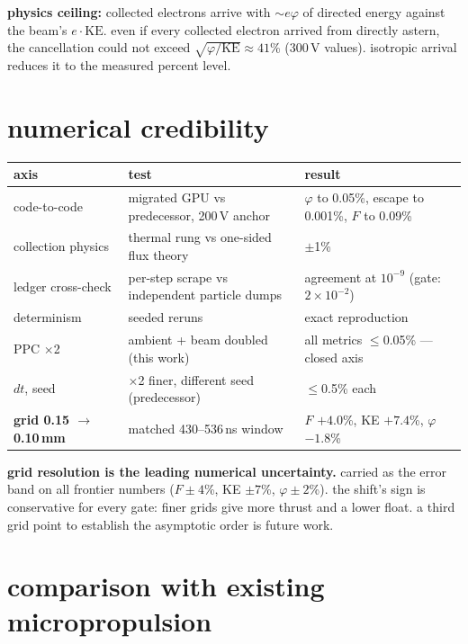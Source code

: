\documentclass[11pt]{article}
\begin{document}
\textbf{physics ceiling:} collected electrons arrive with $\sim$$e\varphi$ of
directed energy against the beam's $e\cdot\mathrm{KE}$.  even if every
collected electron arrived from directly astern, the cancellation could not
exceed $\sqrt{\varphi/\mathrm{KE}} \approx 41$\% (300\,V values).  isotropic
arrival reduces it to the measured percent level.

\section{numerical credibility}

\begin{center}\small
\begin{tabular}{lll}
\toprule
axis & test & result \\
\midrule
code-to-code & migrated GPU vs predecessor, 200\,V anchor &
  $\varphi$ to 0.05\%, escape to 0.001\%, $F$ to 0.09\% \\
collection physics & thermal rung vs one-sided flux theory & $\pm$1\% \\
ledger cross-check & per-step scrape vs independent particle dumps &
  agreement at $10^{-9}$ (gate: $2\times10^{-2}$) \\
determinism & seeded reruns & exact reproduction \\
PPC $\times$2 & ambient + beam doubled (this work) &
  all metrics $\le$0.05\% --- \textcolor{gpass}{closed axis} \\
$dt$, seed & $\times$2 finer, different seed (predecessor) &
  $\le$0.5\% each \\
\textbf{grid 0.15 $\to$ 0.10\,mm} & matched 430--536\,ns window &
  $F$ $+4.0$\%, KE $+7.4$\%, $\varphi$ $-1.8$\% \\
\bottomrule
\end{tabular}
\end{center}

\textbf{grid resolution is the leading numerical uncertainty.}  carried as
the error band on all frontier numbers ($F \pm 4$\%, KE $\pm 7$\%,
$\varphi \pm 2$\%).  the shift's sign is conservative for every gate: finer
grids give more thrust and a lower float.  a third grid point to establish
the asymptotic order is future work.

\section{comparison with existing micropropulsion}
\end{document}
